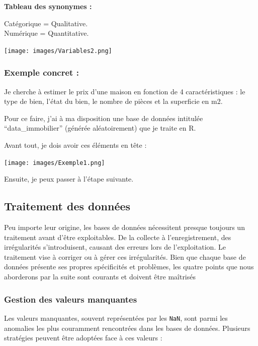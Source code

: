 \documentclass[
  letterpaper,
  DIV=11,
  numbers=noendperiod]{scrartcl}
\begin{document}
\textbf{Tableau des synonymes :}

Catégorique = Qualitative.\\
Numérique = Quantitative.

\hfill
\texttt{[image: images/Variables2.png]}

\newpage

\subsubsection{Exemple concret :}\label{exemple-concret}

Je cherche à estimer le prix d'une maison en fonction de 4
caractéristiques : le type de bien, l'état du bien, le nombre de pièces
et la superficie en m2.

Pour ce faire, j'ai à ma disposition une base de données intitulée
``data\_immobilier'' (générée aléatoirement) que je traite en R.

Avant tout, je dois avoir ces éléments en tête :

\begin{center}
\texttt{[image: images/Exemple1.png]}
\end{center}

Ensuite, je peux passer à l'étape suivante.

\subsection{Traitement des données}\label{traitement-des-donnuxe9es}

Peu importe leur origine, les bases de données nécessitent presque
toujours un traitement avant d'être exploitables. De la collecte à
l'enregistrement, des irrégularités s'introduisent, causant des erreurs
lors de l'exploitation. Le traitement vise à corriger ou à gérer ces
irrégularités. Bien que chaque base de données présente ses propres
spécificités et problèmes, les quatre points que nous aborderons par la
suite sont courants et doivent être maîtrisés

\subsubsection{Gestion des valeurs
manquantes}\label{gestion-des-valeurs-manquantes}

Les valeurs manquantes, souvent représentées par les \texttt{NaN}, sont
parmi les anomalies les plus couramment rencontrées dans les bases de
données. Plusieurs stratégies peuvent être adoptées face à ces valeurs :
\end{document}
